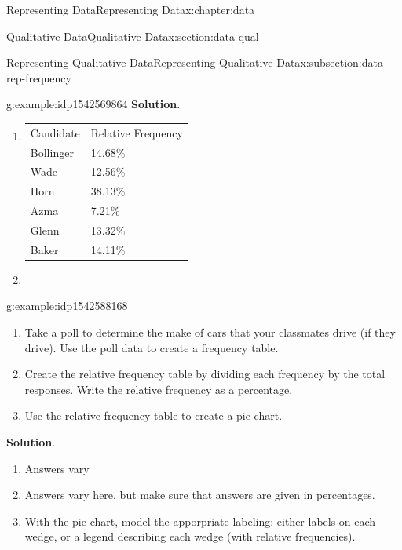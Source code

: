 \documentclass[oneside,10pt,]{book}
\newcommand{\blocktitlefont}{\relax}
\newcommand{\tabularfont}{\relax}
\begin{document}
\begin{chapterptx}{Representing Data}{}{Representing Data}{}{}{x:chapter:data}
\begin{sectionptx}{Qualitative Data}{}{Qualitative Data}{}{}{x:section:data-qual}
\begin{subsectionptx}{Representing Qualitative Data}{}{Representing Qualitative Data}{}{}{x:subsection:data-rep-frequency}
\begin{example}{}{g:example:idp1542569864}
\noindent\textbf{\blocktitlefont Solution}.\hypertarget{g:solution:idp1542580616}{}\quad{}%
\begin{enumerate}[label=\alph*]
\item{}\begin{center}%
{\tabularfont%
\begin{tabular}{ll}
Candidate&Relative Frequency\tabularnewline[0pt]
Bollinger&14.68\%\tabularnewline[0pt]
Wade&12.56\%\tabularnewline[0pt]
Horn&38.13\%\tabularnewline[0pt]
Azma&7.21\%\tabularnewline[0pt]
Glenn&13.32\%\tabularnewline[0pt]
Baker&14.11\%
\end{tabular}
}%
\end{center}%
%
\item{}\begin{image}{0}{1}{0}%
%
\end{image}%
%
\end{enumerate}
%
\end{example}
\begin{example}{}{g:example:idp1542588168}%
%
\begin{enumerate}[label=\alph*]
\item{}Take a poll to determine the make of cars that your classmates drive (if they drive).  Use the poll data to create a frequency table.%
\item{}Create the relative frequency table by dividing each frequency by the total responses.  Write the relative frequency as a percentage.%
\item{}Use the relative frequency table to create a pie chart.%
\end{enumerate}
%
\par\smallskip%
\noindent\textbf{\blocktitlefont Solution}.\hypertarget{g:solution:idp1542595976}{}\quad{}%
\begin{enumerate}[label=\alph*]
\item{}Answers vary%
\item{}Answers vary here, but make sure that answers are given in percentages.%
\item{}With the pie chart, model the apporpriate labeling: either labels on each wedge, or a legend describing each wedge (with relative frequencies).%
\end{enumerate}
%
\end{example}

\end{subsectionptx}
\end{sectionptx}
\end{chapterptx}
\end{document}

